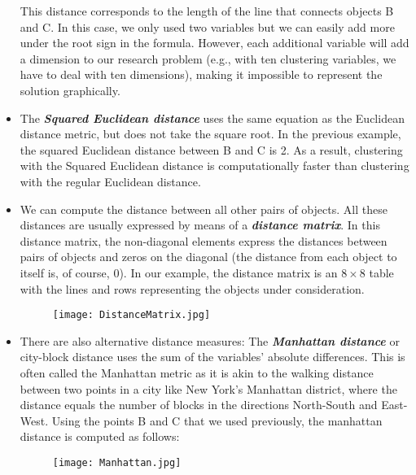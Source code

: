 \documentclass[a4paper,12pt]{article}
\begin{document}
\begin{itemize}
This distance corresponds to the length of the line that connects objects B and C.
In this case, we only used two variables but we can easily add more under the root
sign in the formula. However, each additional variable will add a dimension to our
research problem (e.g., with ten clustering variables, we have to deal with ten
dimensions), making it impossible to represent the solution graphically.

\item  The \textbf{\textit{Squared Euclidean distance}} uses the same equation as the Euclidean distance metric, but does not take the square root. In the previous example, the squared Euclidean distance between B and C is 2.
As a result, clustering with the Squared Euclidean distance is computationally faster than clustering with the regular Euclidean distance.

\item We can compute the distance between all other pairs of objects. All
these distances are usually expressed by means of a \textit{\textbf{distance matrix}}. In this distance
matrix, the non-diagonal elements express the distances between pairs of objects
and zeros on the diagonal (the distance from each object to itself is, of course, 0). In
our example, the distance matrix is an $8 \times 8$ table with the lines and rows
representing the objects under consideration.
\begin{figure}[h!]
\begin{center}
  \texttt{[image: DistanceMatrix.jpg]}\\
\end{center}
\end{figure}

\item There are also alternative distance measures: The \textbf{\textit{Manhattan distance}} or city-block distance uses the sum of the variables’ absolute differences. This is often called the Manhattan metric
as it is akin to the walking distance between two points in a city like New York’s
Manhattan district, where the distance equals the number of blocks in the directions
North-South and East-West. Using the points B and C that we used previously, the manhattan distance is computed as follows:
\begin{figure}[h!]
\begin{center}
  \texttt{[image: Manhattan.jpg]}\\
\end{center}
\end{figure}



\end{itemize}
\end{document}

